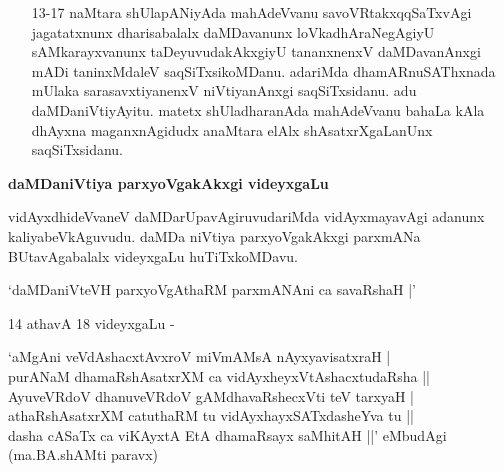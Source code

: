 \begin{itemize}

\item [13-17] naMtara shUlapANiyAda mahAdeVvanu savoVRtakxqqSaTxvAgi jagatatxnunx dharisabalalx daMDavanunx loVkadhAraNegAgiyU sAMkarayxvanunx taDeyuvudakAkxgiyU tananxnenxV daMDavanAnxgi mADi taninxMdaleV saqSiTxsikoMDanu. adariMda dhamARnuSAThxnada mUlaka sarasavxtiyanenxV niVtiyanAnxgi saqSiTxsidanu. adu daMDaniVtiyAyitu. matetx shUladharanAda mahAdeVvanu bahaLa kAla dhAyxna maganxnAgidudx anaMtara elAlx shAsatxrXgaLanUnx saqSiTxsidanu.
\end{itemize}

\noindent
\textbf{daMDaniVtiya parxyoVgakAkxgi videyxgaLu}\label{page99}

vidAyxdhideVvaneV daMDarUpavAgiruvudariMda vidAyxmayavAgi adanunx kaliyabeVkAguvudu. daMDa niVtiya parxyoVgakAkxgi parxmANa BUtavAgabalalx videyxgaLu huTiTxkoMDavu.

\begin{shloka}
`daMDaniVteVH parxyoVgAthaRM parxmANAni ca savaRshaH |'\label{99}
\end{shloka}

14 athavA 18 videyxgaLu -

\begin{shloka}
`aMgAni veVdAshacxtAvxroV miVmAMsA nAyxyavisatxraH |\\
purANaM dhamaRshAsatxrXM ca vidAyxheyxVtAshacxtudaRsha ||\\

AyuveVRdoV dhanuveVRdoV gAMdhavaRshecxVti teV tarxyaH |\\
athaRshAsatxrXM catuthaRM tu vidAyxhayxSATxdasheYva tu ||\\

dasha cASaTx ca viKAyxtA EtA dhamaRsayx saMhitAH ||' eMbudAgi\\
(ma.BA.shAMti paravx)
\end{shloka}

